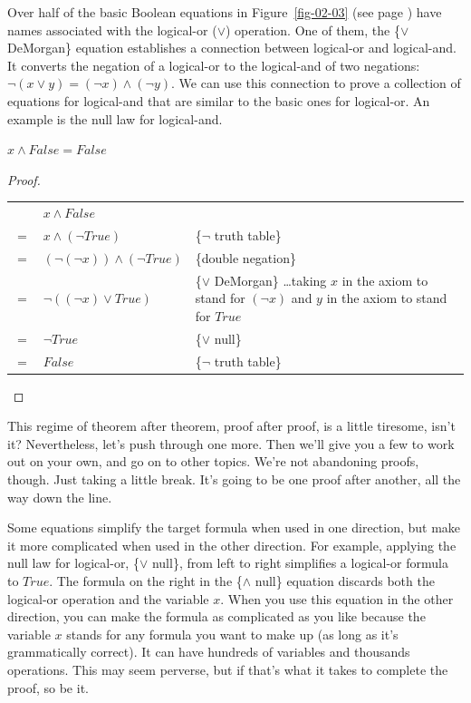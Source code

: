 Over half of the basic Boolean equations in Figure~\ref{fig-02-03} (see page \pageref{fig-02-03})
have names associated with the logical-or ($\vee$) operation.
One of them, the
\{$\vee$ DeMorgan\} equation establishes a connection between logical-or and logical-and.
It converts the negation of a logical-or to the logical-and of two negations:
$\neg(x \vee y) = (\neg x) \wedge (\neg y)$.
We can use this connection to prove a collection of equations for logical-and that are similar to the basic ones for logical-or.
An example is the null law for logical-and.

\begin{theorem}
$x \wedge False = False$
\end{theorem}

\begin{proof}
\mbox{} \\
\begin{tabular}{llp{3.15in}}
    & $x \wedge False$                       & \\
$=$ & $x \wedge (\neg True)$                 & \{$\neg$ truth table\} \\
$=$ & $(\neg (\neg x)) \wedge (\neg True)$   & \{double negation\} \\
$=$ & $\neg ((\neg x) \vee True)$            & \{$\vee$ DeMorgan\} \dots taking $x$ in the axiom to stand for $(\neg x)$ and $y$ in the axiom to stand for $True$  \\
$=$ & $\neg True$                            & \{$\vee$ null\} \\
$=$ & $False$                                & \{$\neg$ truth table\} \\
\end{tabular}

\end{proof}

This regime of theorem after theorem, proof after proof, is a little tiresome, isn't it?
Nevertheless, let's push through one more.
Then we'll give you a few to work out on your own, and go on to other topics.
We're not abandoning proofs, though. Just taking a little break.
It's going to be one proof after another, all the way down the line.

Some equations simplify the target formula when used in one direction,
but make it more complicated when used in the other direction.
For example, applying
the null law for logical-or, \{$\vee$ null\}, from left to right simplifies a logical-or formula to $True$.
The formula on the right in the \{$\wedge$ null\} equation discards both the logical-or operation and the variable $x$.
When you use this equation in the other direction, you can make the formula as complicated as you like because the variable $x$ stands for any formula you want to make up (as long as it's grammatically correct).
It can have hundreds of variables and thousands operations.
This may seem perverse, but if that's what it takes to complete the proof, so be it.

